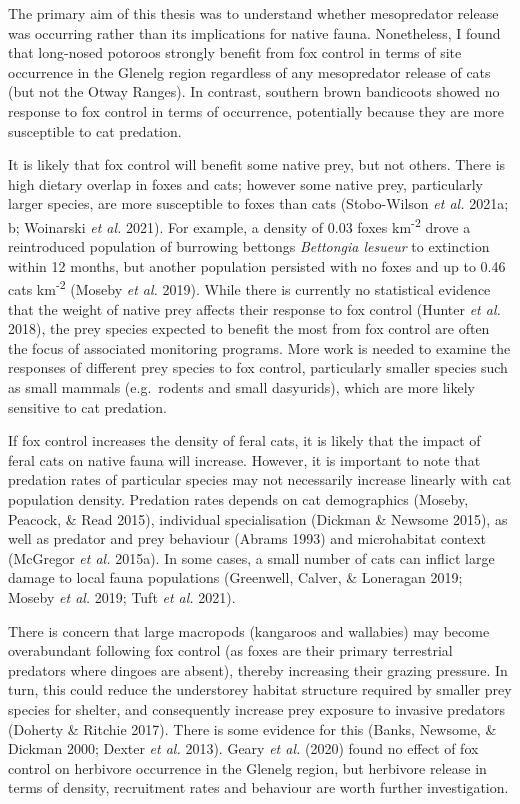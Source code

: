 \documentclass[11pt,a4paper,titlepage,twoside,openright]{style/unimelbthesis}
\begin{document}
\begin{mainmatter}
The primary aim of this thesis was to understand whether mesopredator release was occurring rather than its implications for native fauna. Nonetheless, I found that long-nosed potoroos strongly benefit from fox control in terms of site occurrence in the Glenelg region regardless of any mesopredator release of cats (but not the Otway Ranges). In contrast, southern brown bandicoots showed no response to fox control in terms of occurrence, potentially because they are more susceptible to cat predation.

It is likely that fox control will benefit some native prey, but not others. There is high dietary overlap in foxes and cats; however some native prey, particularly larger species, are more susceptible to foxes than cats (Stobo-Wilson \emph{et al.} 2021a; b; Woinarski \emph{et al.} 2021). For example, a density of 0.03 foxes km\textsuperscript{-2} drove a reintroduced population of burrowing bettongs \emph{Bettongia lesueur} to extinction within 12 months, but another population persisted with no foxes and up to 0.46 cats km\textsuperscript{-2} (Moseby \emph{et al.} 2019). While there is currently no statistical evidence that the weight of native prey affects their response to fox control (Hunter \emph{et al.} 2018), the prey species expected to benefit the most from fox control are often the focus of associated monitoring programs. More work is needed to examine the responses of different prey species to fox control, particularly smaller species such as small mammals (e.g.~rodents and small dasyurids), which are more likely sensitive to cat predation.

If fox control increases the density of feral cats, it is likely that the impact of feral cats on native fauna will increase. However, it is important to note that predation rates of particular species may not necessarily increase linearly with cat population density. Predation rates depends on cat demographics (Moseby, Peacock, \& Read 2015), individual specialisation (Dickman \& Newsome 2015), as well as predator and prey behaviour (Abrams 1993) and microhabitat context (McGregor \emph{et al.} 2015a). In some cases, a small number of cats can inflict large damage to local fauna populations (Greenwell, Calver, \& Loneragan 2019; Moseby \emph{et al.} 2019; Tuft \emph{et al.} 2021).

There is concern that large macropods (kangaroos and wallabies) may become overabundant following fox control (as foxes are their primary terrestrial predators where dingoes are absent), thereby increasing their grazing pressure. In turn, this could reduce the understorey habitat structure required by smaller prey species for shelter, and consequently increase prey exposure to invasive predators (Doherty \& Ritchie 2017). There is some evidence for this (Banks, Newsome, \& Dickman 2000; Dexter \emph{et al.} 2013). Geary \emph{et al.} (2020) found no effect of fox control on herbivore occurrence in the Glenelg region, but herbivore release in terms of density, recruitment rates and behaviour are worth further investigation.


\end{mainmatter}
\end{document}
